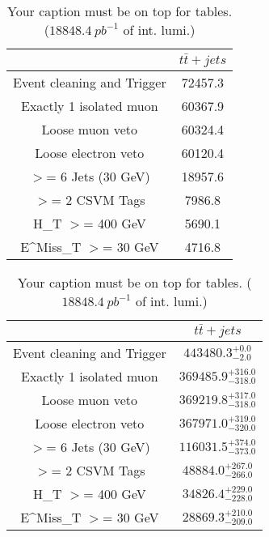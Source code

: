 \documentclass{article}
\begin{document}
\begin{table}
\caption{Your caption must be on top for tables. ($18848.4~pb^{-1}$ of int. lumi.)}
\label{tab:}
\centering
\begin{tabular}{|c|c|}
\toprule
&$t\bar{t}+jets$	\\

\midrule
Event cleaning and Trigger&	72457.3	\\

Exactly 1 isolated muon&	60367.9	\\

Loose muon veto&	60324.4	\\

Loose electron veto&	60120.4	\\

$>$= 6 Jets (30 GeV)&	18957.6	\\

$>$= 2 CSVM Tags&	7986.8	\\

H_{T} $>$=  400 GeV&	5690.1	\\

E^{Miss}_{T} $>$=  30 GeV&	4716.8	\\

\bottomrule
\end{tabular}
\end{table}
\begin{table}
\caption{Your caption must be on top for tables. ($18848.4~pb^{-1}$ of int. lumi.)}
\label{tab:}
\centering
\begin{tabular}{|c|c|}
\toprule
&$t\bar{t}+jets$	\\

\midrule
Event cleaning and Trigger&	$443480.3^{+0.0}_{-2.0}$	\\

Exactly 1 isolated muon&	$369485.9^{+316.0}_{-318.0}$	\\

Loose muon veto&	$369219.8^{+317.0}_{-318.0}$	\\

Loose electron veto&	$367971.0^{+319.0}_{-320.0}$	\\

$>$= 6 Jets (30 GeV)&	$116031.5^{+374.0}_{-373.0}$	\\

$>$= 2 CSVM Tags&	$48884.0^{+267.0}_{-266.0}$	\\

H_{T} $>$=  400 GeV&	$34826.4^{+229.0}_{-228.0}$	\\

E^{Miss}_{T} $>$=  30 GeV&	$28869.3^{+210.0}_{-209.0}$	\\

\bottomrule
\end{tabular}
\end{table}
\end{document}
